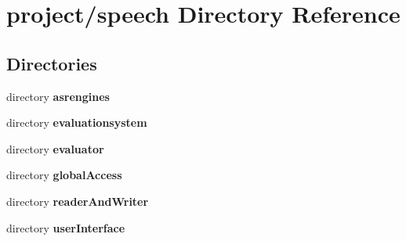 \section{project/speech Directory Reference}
\label{dir_3721d838ac49a75060be5d76f7669942}
\subsection*{Directories}
\begin{DoxyCompactItemize}
\item 
directory {\bf asrengines}
\item 
directory {\bf evaluationsystem}
\item 
directory {\bf evaluator}
\item 
directory {\bf global\+Access}
\item 
directory {\bf reader\+And\+Writer}
\item 
directory {\bf user\+Interface}
\end{DoxyCompactItemize}

